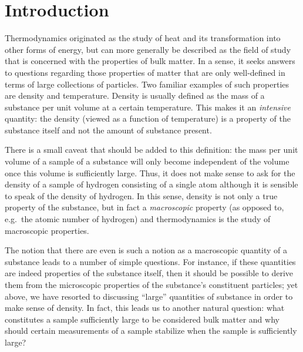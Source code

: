 
\chapter{Introduction}
\label{sec:intro}


Thermodynamics originated as the study of heat and its transformation into other
forms of energy, but can more generally be described as the field of study that
is concerned with the properties of bulk matter. In a sense, it seeks
answers to questions regarding those properties of matter that are only well-defined
in terms of large collections of particles. Two familiar examples of
such properties are density and temperature. Density is usually defined as the mass
of a substance per unit volume at a certain temperature. This makes it an
\emph{intensive} quantity: the density (viewed as a function of temperature) is
a property of the substance itself and not the amount of substance present.

There is a small caveat that should be added to this definition: the mass per unit
volume of a sample of a substance will only become independent
of the volume once this volume is sufficiently large. Thus, it does not make sense
to ask for the density of a sample of hydrogen consisting of a single atom although
it is sensible to speak of the density of hydrogen. In this sense, density is not
only a true property of the substance, but in fact a \emph{macroscopic} property
(as opposed to, e.g.\ the atomic number of hydrogen) and thermodynamics is the
study of macroscopic properties.

The notion that there are even is such a notion as a macroscopic quantity of a
substance leads to a number of simple questions. For instance, if these quantities
are indeed properties of the substance itself, then it should be possible to 
derive them from the microscopic properties of the substance's constituent particles;
yet above, we have resorted to discussing ``large'' quantities of substance in order
to make sense of density. In fact, this leads us to another natural question: what
constitutes a sample sufficiently large to be considered bulk matter and why should
certain measurements of a sample stabilize when the sample is sufficiently large?

